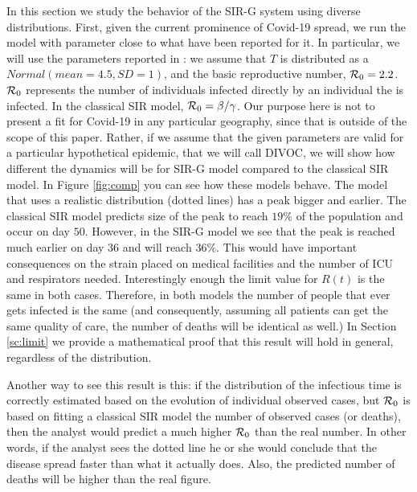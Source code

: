 \documentclass[USenglish,10pt]{article}
\newcommand{\Ro}{\ensuremath\mathcal{R}_0\xspace}
\begin{document}
In this section we study the behavior of the SIR-G system using diverse distributions.
First, given the current prominence of Covid-19 spread, we run the model with parameter close to what have been reported for it. In particular, we will use the parameters reported in \cite{lour.ea20}: we assume that $T$ is distributed as a $Normal(mean=4.5, SD=1)$, and the basic reproductive number, $\Ro=2.2$.
$\Ro$ represents the number of individuals infected directly by an individual the is infected. In the classical SIR model, $\Ro=\beta/\gamma$.
Our purpose here is not to present a fit for Covid-19 in any particular geography, since that is outside of the scope of this paper.
Rather, if we assume that the given parameters are valid for a particular hypothetical epidemic, that we will call DIVOC, we will show how different the dynamics will be for SIR-G model compared to the classical SIR model.
In Figure \ref{fig:comp} you can see how these models behave. The model that uses a realistic distribution (dotted lines) has a peak bigger and earlier. The classical SIR model predicts size of the peak to reach $19\%$ of the population and occur on day $50$.
However, in the SIR-G model we see that the peak is reached much earlier on day $36$ and will reach $36\%$. This would have important consequences on the strain placed on medical facilities and the number of ICU and respirators needed.
Interestingly enough the limit value for $R(t)$ is the same in both cases. Therefore, in both models the number of people that ever gets infected is the same (and consequently, assuming all patients can get the same quality of care, the number of deaths will be identical as well.) In Section \ref{sc:limit} we provide a mathematical proof that this result will hold in general, regardless of the distribution.

Another way to see this result is this: if the distribution of the infectious time is correctly estimated based on the evolution of individual observed cases, but $\Ro$ is based on fitting a classical SIR model the number of observed cases (or deaths), then the analyst would predict a much higher $\Ro$ than the real number. In other words, if the analyst sees the dotted line he or she would conclude that the disease spread faster than what it actually does. Also, the predicted number of deaths will be higher than the real figure.
\end{document}
